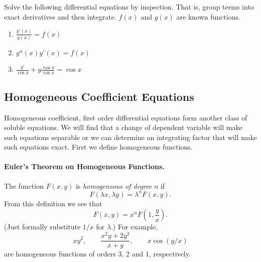 





\begin{Exercise}
  \label{exercise gygyf}
  Solve the following differential equations by inspection.  That is, group 
  terms into exact derivatives and then integrate. 
  $f(x)$ and $g(x)$ are known functions.
  \begin{enumerate}
  \item $\frac{y'(x)}{y(x)} = f(x)$
  \item $y^\alpha(x) y'(x) = f(x)$
  \item $\frac{y'}{\cos x} + y \frac{\tan x}{\cos x} = \cos x$
  \end{enumerate}

\end{Exercise}























\subsection{Homogeneous Coefficient Equations}



Homogeneous coefficient, first order differential equations form another class
of soluble equations.  We will find that a change of dependent variable 
will make such equations separable or we can determine an integrating factor 
that will make such equations exact.  First we define homogeneous functions.



\paragraph{Euler's Theorem on Homogeneous Functions.}
The function $F(x,y)$ is \textit{homogeneous of degree} $n$ if
\[
F(\lambda x,\lambda y) = \lambda^n F(x,y).
\]
From this definition we see that
\[
F(x,y) = x^n F \left( 1, \frac{y}{x} \right).
\]
(Just formally substitute $1/x$ for $\lambda$.)
For example, 
\[
x y^2, \qquad
\frac{x^2 y+ 2 y^3}{x + y}, \qquad
x \cos(y/x)
\]
are homogeneous functions of orders 3, 2 and 1, respectively.


